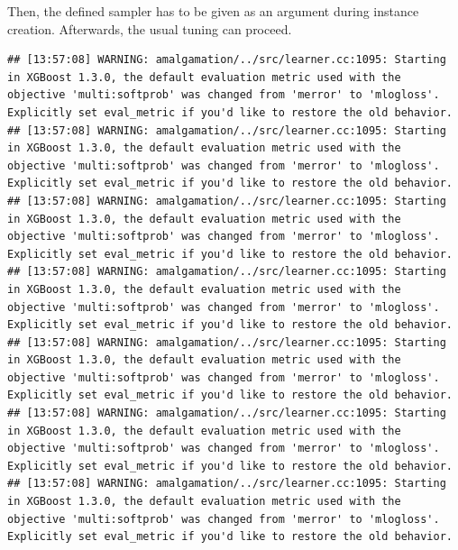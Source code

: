 \documentclass[
]{scrbook}
\newenvironment{Shaded}{\begin{snugshade}}{\end{snugshade}}
\newcommand{\AttributeTok}[1]{\textcolor[rgb]{0.77,0.63,0.00}{#1}}
\newcommand{\DecValTok}[1]{\textcolor[rgb]{0.00,0.00,0.81}{#1}}
\newcommand{\FunctionTok}[1]{\textcolor[rgb]{0.00,0.00,0.00}{#1}}
\newcommand{\NormalTok}[1]{#1}
\newcommand{\OtherTok}[1]{\textcolor[rgb]{0.56,0.35,0.01}{#1}}
\newcommand{\SpecialCharTok}[1]{\textcolor[rgb]{0.00,0.00,0.00}{#1}}
\newcommand{\StringTok}[1]{\textcolor[rgb]{0.31,0.60,0.02}{#1}}
\renewenvironment{Shaded} {\begin{snugshade}\small} {\end{snugshade}}
\begin{document}
Then, the defined sampler has to be given as an argument during instance creation.
Afterwards, the usual tuning can proceed.

\begin{Shaded}
\end{Shaded}

\begin{verbatim}
## [13:57:08] WARNING: amalgamation/../src/learner.cc:1095: Starting in XGBoost 1.3.0, the default evaluation metric used with the objective 'multi:softprob' was changed from 'merror' to 'mlogloss'. Explicitly set eval_metric if you'd like to restore the old behavior.
## [13:57:08] WARNING: amalgamation/../src/learner.cc:1095: Starting in XGBoost 1.3.0, the default evaluation metric used with the objective 'multi:softprob' was changed from 'merror' to 'mlogloss'. Explicitly set eval_metric if you'd like to restore the old behavior.
## [13:57:08] WARNING: amalgamation/../src/learner.cc:1095: Starting in XGBoost 1.3.0, the default evaluation metric used with the objective 'multi:softprob' was changed from 'merror' to 'mlogloss'. Explicitly set eval_metric if you'd like to restore the old behavior.
## [13:57:08] WARNING: amalgamation/../src/learner.cc:1095: Starting in XGBoost 1.3.0, the default evaluation metric used with the objective 'multi:softprob' was changed from 'merror' to 'mlogloss'. Explicitly set eval_metric if you'd like to restore the old behavior.
## [13:57:08] WARNING: amalgamation/../src/learner.cc:1095: Starting in XGBoost 1.3.0, the default evaluation metric used with the objective 'multi:softprob' was changed from 'merror' to 'mlogloss'. Explicitly set eval_metric if you'd like to restore the old behavior.
## [13:57:08] WARNING: amalgamation/../src/learner.cc:1095: Starting in XGBoost 1.3.0, the default evaluation metric used with the objective 'multi:softprob' was changed from 'merror' to 'mlogloss'. Explicitly set eval_metric if you'd like to restore the old behavior.
## [13:57:08] WARNING: amalgamation/../src/learner.cc:1095: Starting in XGBoost 1.3.0, the default evaluation metric used with the objective 'multi:softprob' was changed from 'merror' to 'mlogloss'. Explicitly set eval_metric if you'd like to restore the old behavior.

\end{verbatim}
\end{document}
